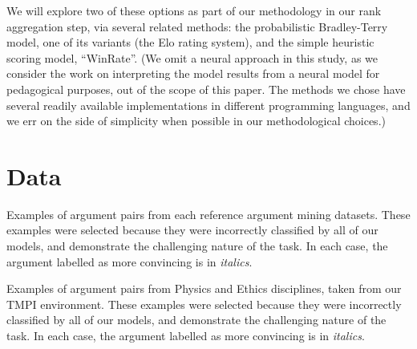\documentclass[notitlepage,12pt]{jedm}
\begin{document}
We will explore two of these options as part of our methodology in our rank 
aggregation step, via several related methods: the probabilistic Bradley-Terry 
model, one of its variants (the Elo rating system), and the simple heuristic 
scoring model, ``WinRate''.
(We omit a neural approach in this study, as we consider the work on 
interpreting the model results from a neural model for pedagogical purposes, 
out of the scope of this paper.
The methods we chose have several readily available implementations in 
different programming languages, and we err on the side of simplicity when 
possible in our methodological choices.)



\section{Data}\label{sec:datasets}

\begin{table}
	\caption{
		Examples of argument pairs from each reference argument mining 
		datasets. 
		These examples were selected because they were incorrectly classified 
		by all of our models, and demonstrate the challenging nature of the 
		task. 
		In each case, the argument labelled as more convincing is in 
		\textit{italics}.
	}
	\label{tab:sample_obs}
	\begin{subtable}[t]{\textwidth}
		
	\end{subtable}
	\begin{subtable}[t]{\textwidth}
		
	\end{subtable}
\end{table}

\begin{table}
	\caption{
		Examples of argument pairs from Physics and Ethics disciplines, taken 
		from our TMPI environment. 
		These examples were selected because they were incorrectly classified 
		by all of our models, and demonstrate the challenging nature of the 
		task. 
		In each case, the argument labelled as more convincing is in 
		\textit{italics}.}
	\label{tab:sample_obs_dalite}
	\begin{subtable}[t]{\textwidth}
		
	\end{subtable}
	\begin{subtable}[t]{\textwidth}
	
	\end{subtable}
\end{table}
\end{document}
